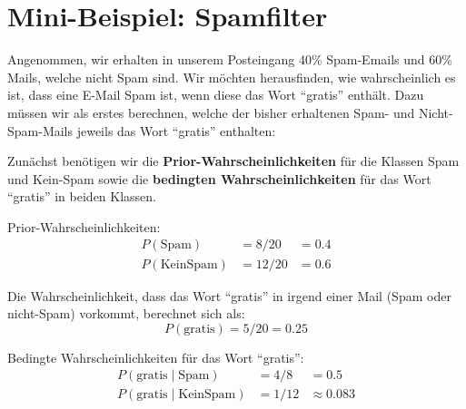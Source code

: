 \section{Mini-Beispiel: Spamfilter}

\begin{myexample}
    Angenommen, wir erhalten in unserem Posteingang 40\% Spam-Emails und 60\% Mails, welche nicht Spam sind. Wir möchten herausfinden, wie wahrscheinlich es ist, dass eine E-Mail Spam ist, wenn diese das Wort \enquote{gratis} enthält. Dazu müssen wir als erstes berechnen, welche der bisher erhaltenen Spam- und Nicht-Spam-Mails jeweils das Wort ``gratis'' enthalten:


    \begin{table}[H]
        \centering
    \end{table}



    Zunächst benötigen wir die \textbf{Prior-Wahrscheinlichkeiten} für die Klassen Spam und Kein-Spam sowie die \textbf{bedingten Wahrscheinlichkeiten} für das Wort \enquote{gratis} in beiden Klassen.

    Prior-Wahrscheinlichkeiten:
    \[
        \begin{aligned}
            P(\text{Spam})     & = 8/20  & = 0.4 \\
            P(\text{KeinSpam}) & = 12/20 & = 0.6
        \end{aligned}
    \]

    Die Wahrscheinlichkeit, dass das Wort \enquote{gratis} in irgend einer Mail (Spam oder nicht-Spam) vorkommt, berechnet sich als:
    \[
        P(\text{gratis}) = 5/20 = 0.25
    \]


    Bedingte Wahrscheinlichkeiten für das Wort \enquote{gratis}:
    \[
        \begin{aligned}
            P(\text{gratis}\mid\text{Spam})     & = 4/8  & = 0.5         \\
            P(\text{gratis}\mid\text{KeinSpam}) & = 1/12 & \approx 0.083
        \end{aligned}
    \]


\end{myexample}

